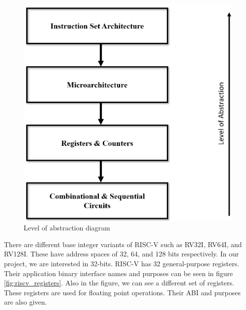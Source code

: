 \begin{figure}[h!]
    \centering
    \includegraphics[scale=0.25]{riscv/level_of_abstraction_diagram.jpeg}
    \caption{Level of abstraction diagram \cite{levelofabstrac}}
    \label{fig:level_of_abstraction_diagram}
\end{figure}

There are different base integer variants of RISC-V such as RV32I, RV64I, and RV128I. These have address spaces of 32, 64, and 128 bits respectively. \cite{Altinayozlem} In our project, we are interested in 32-bits. RISC-V has 32 general-purpose registers. Their application binary interface names and purposes can be seen in figure \ref{fig:riscv_registers}. Also in the figure, we can see a different set of registers. These registers are used for floating point operations. Their ABI and purposes are also given.

